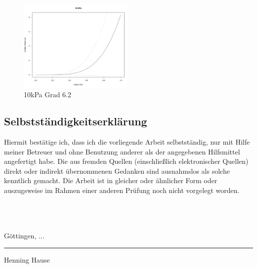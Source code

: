 \documentclass[12pt,a4paper]{article}
\theoremstyle{definition}
\theoremstyle{definition}
\theoremstyle{definition}
\begin{document}
\begin{figure}[H] 
  \centering
     \includegraphics[width=0.5\textwidth]{10kPa-Grad-6-2-KB}
  \caption{10kPa Grad 6.2}
  \label{10kPa Grad 6.2}
\end{figure}



\nocite{Hsu41}

\newpage
\printbibliography


\newpage
\subsection*{Selbstständigkeitserklärung}
Hiermit bestätige ich, dass ich die vorliegende Arbeit selbstständig, nur mit Hilfe meiner Betreuer und ohne Benutzung anderer als der angegebenen Hilfsmittel angefertigt habe. Die aus fremden Quellen (einschließlich elektronischer Quellen) direkt oder indirekt übernommenen Gedanken sind ausnahmslos als solche kenntlich gemacht. Die Arbeit ist in gleicher oder ähnlicher Form oder auszugsweise im Rahmen einer anderen Prüfung noch nicht vorgelegt worden.
\\ \\ \\ \\
\parbox{5cm}{\centering Göttingen, ... }
\hfill\parbox{4cm}{\hrule \strut \centering  \footnotesize Henning Hause}
\end{document}
